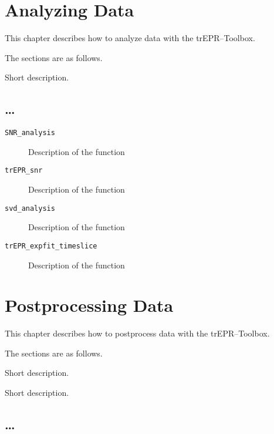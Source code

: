 \documentclass[a4paper]{refrep}
\newcommand{\trEPRtb}{\textsf{trEPR--Toolbox}}
\begin{document}
\chapter{Analyzing Data}

This chapter describes how to analyze data with the 
\trEPRtb.

The sections are as follows.

\vspace*{3\parsep}

\begin{description}\descriptioncolonfalse
  \item[\ldots] Short description.
\end{description}

\clearpage


\section{\ldots}

\begin{description}
  \item[\texttt{SNR\_analysis}] Description of the function
  \item[\texttt{trEPR\_snr}] Description of the function
  \item[\texttt{svd\_analysis}] Description of the function
  \item[\texttt{trEPR\_expfit\_timeslice}] Description of the function
\end{description}


\chapter{Postprocessing Data}

This chapter describes how to postprocess data with the 
\trEPRtb.

The sections are as follows.

\vspace*{3\parsep}

\begin{description}\descriptioncolonfalse
  \item[Saving Figures] Short description.
  \item[Saving Data] Short description.
\end{description}

\clearpage


\section{\ldots}
\end{document}
